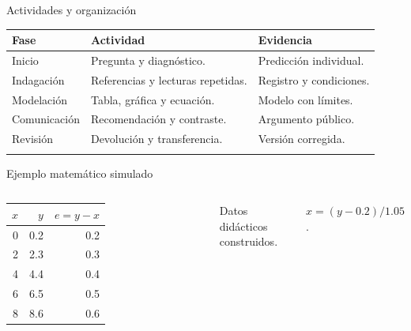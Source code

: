 \documentclass[
	spanish,
	aspectratio=1610,
	xcolor={dvipsnames,table}
]{beamer}
\begin{document}
\begin{frame}{Actividades y organización}
\small\renewcommand{\arraystretch}{1.45}\begin{tabularx}{\linewidth}{X|X|X}\toprule
\textbf{Fase} & \textbf{Actividad} & \textbf{Evidencia}\\\midrule
Inicio & Pregunta y diagnóstico. & Predicción individual.\\\addlinespace
Indagación & Referencias y lecturas repetidas. & Registro y condiciones.\\\addlinespace
Modelación & Tabla, gráfica y ecuación. & Modelo con límites.\\\addlinespace
Comunicación & Recomendación y contraste. & Argumento público.\\\addlinespace
Revisión & Devolución y transferencia. & Versión corregida.\\\addlinespace
\bottomrule\end{tabularx}
\end{frame}
\begin{frame}{Ejemplo matemático simulado}
\begin{columns}[T,onlytextwidth]\small
\begin{tabular}{rrr}\toprule $x$&$y$&$e=y-x$\\\midrule 0&0.2&0.2\\2&2.3&0.3\\4&4.4&0.4\\6&6.5&0.5\\8&8.6&0.6\\\bottomrule\end{tabular}\par\vspace{.3cm}
Datos didácticos construidos.\par $x=(y-0.2)/1.05$.
\centering{}\end{columns}
\end{frame}
\end{document}
